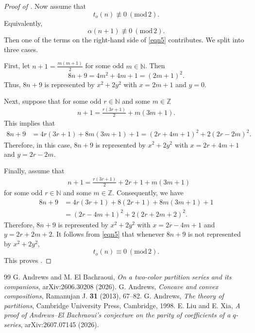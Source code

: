 \documentclass[10pt,a4paper]{amsart}
\renewcommand{\a}{\alpha}
\renewcommand{\(}{\left\(}
\renewcommand{\)}{\right\)}
\numberwithin{equation}{section}
\numberwithin{equation}{section}
\renewcommand{\pmod}[1]{\ \left( \mathrm{mod} \, #1 \right)}
\begin{document}
\begin{proof}[Proof of ]
Now assume that 
\[
t_o(n)\not\equiv 0\pmod{2}.%
\]
Equivalently,
\[
\a(n+1)\not\equiv 0\pmod{2}.
\]
Then one of the terms on the right-hand side of \eqref{eqn5} contributes. We split into three cases.

 First, let $n+1=\frac{m(m+1)}{2}$ for some odd $m\in \mathbb{N}$. Then %
\[
 8n+9=4m^2+4m+1=(2m+1)^2.
\]
Thus, $8n+9$ is represented by $x^2+2y^2$ with $x=2m+1$ and $y=0$.  

Next, suppose that for some odd $r\in \mathbb{N}$ and some $m\in \mathbb{Z}$
\begin{align*}
n+1=\frac{r(3r+1)}{2}+m(3m+1).
\end{align*}
This implies that
\begin{align*}
 8n+9&=4r(3r+1)+8m(3m+1)+1=\left(2r+4m+1\right)^2+2\left(2r-2m\right)^2.
\end{align*}
Therefore, in this case, $8n+9$ is represented by $x^2+2y^2$ with $x=2r+4m+1$ and $y=2r-2m$.

Finally, assume that %
\begin{align*}
&n+1=\frac{r(3r+1)}{2}+2r+1+m(3m+1)
\end{align*}
for some odd $r\in \mathbb{N}$ and some $m\in \mathbb{Z}$. Consequently, we have
\begin{align*}
8n+9&=4r(3r+1)+8(2r+1)+8m(3m+1)+1\\
&=\left(2r-4m+1\right)^2+2\left(2r+2m+2\right)^2.
\end{align*}
Therefore, $8n+9$ is represented by $x^2+2y^2$ with $x=2r-4m+1$ and $y=2r+2m+2$. It follows from \eqref{eqn5} that whenever $8n+9$ is not represented by $x^2+2y^2$,
\[
t_o(n)\equiv 0\pmod{2}.
\]
This proves .\qedhere 
\end{proof}


\begin{thebibliography}{99}
 G. Andrews and M. El Bachraoui, {\it On a two-color partition series and its companions}, arXiv:2606.30208 (2026).
 G. Andrews, {\it Concave and convex compositions}, Ramanujan J. {\bf 31} (2013), 67--82.
 G. Andrews, {\it The theory of partitions}, Cambridge University Press, Cambridge, 1998.
 E. Liu and E. Xia, {\it A proof of Andrews--El Bachraoui's conjecture on the parity of coefficients of a $q$-series}, arXiv:2607.07145 (2026).
\end{thebibliography}
\end{document}
